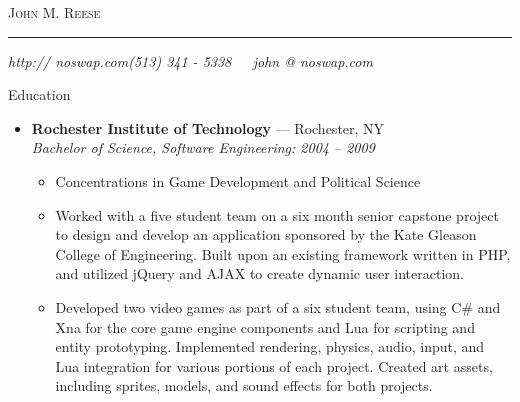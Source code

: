 \documentclass[11pt,oneside]{article}
\makeatletter
\newcommand{\name}{John M. Reese}
\newcommand{\phone}{(513) 341 - 5338}
\newcommand{\email}{john @ noswap.com}
\newcommand{\website}{http:// noswap.com}
\newcommand{\bigname}[1]{
	\begin{center}\fontfamily{ppl}\selectfont\Huge\scshape#1\end{center}
}
\newenvironment{ressection}[1]{
	\vspace{8pt}
	{\fontfamily{phv}\selectfont\Large#1}
	\begin{itemize}
	\vspace{3pt}
}{
	\end{itemize}
}
\newcommand{\ressubitem}[1]{
	\vspace{-1pt}
	\item \begin{flushleft} #1 \end{flushleft}
}
\newcommand{\resbigitem}[3]{
	\vspace{-5pt}
	\item
	\textbf{#1} --- #2 \\
	\textit{#3}
}
\newenvironment{ressubsec}[3]{
	\resbigitem{#1}{#2}{#3}
	\vspace{-2pt}
	\begin{itemize}
}{
	\end{itemize}
}
\makeatother
\begin{document}
 \selectfont

\bigname{\name}

\vspace{-8pt} \rule{\textwidth}{1pt}

\vspace{-1pt} {\small\itshape \website \hfill \phone \ \ \ \email}

\vspace{8 pt}




\begin{ressection}{Education}

	\begin{ressubsec}{Rochester Institute of Technology}{Rochester, NY}
	{Bachelor of Science, Software Engineering:  2004 -- 2009}
		\ressubitem{Concentrations in Game Development and Political Science}
		\ressubitem{Worked with a five student team on a six month senior capstone project
		to design and develop an application sponsored by the Kate Gleason College of Engineering.
		Built upon an existing framework written in PHP, and utilized jQuery and AJAX to create
		dynamic user interaction.}
		\ressubitem{Developed two video games as part of a six student team, using C\# and Xna for
		the core game engine components and Lua for scripting and entity prototyping.  Implemented
		rendering, physics, audio, input, and Lua integration for various portions of each project.
		Created art assets, including sprites, models, and sound effects for both projects.}
	\end{ressubsec}

\end{ressection}
\end{document}
